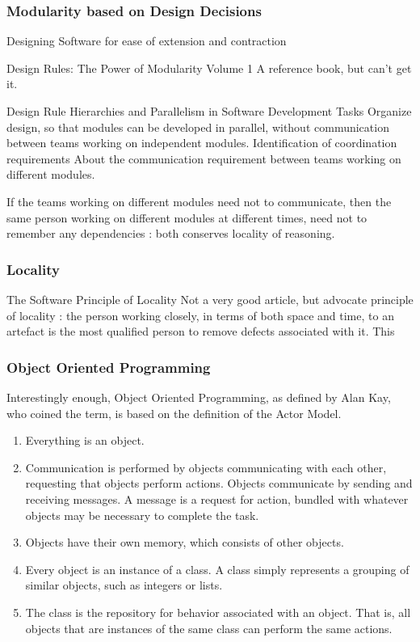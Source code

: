 \subsubsection{Modularity based on Design Decisions}

Designing Software for ease of extension and contraction \cite{Parnas1979}

Design Rules: The Power of Modularity Volume 1 \cite{Baldwin1999}
A reference book, but can't get it.

Design Rule Hierarchies and Parallelism in Software Development Tasks \cite{Wong2009}
Organize design, so that modules can be developed in parallel, without communication between teams working on independent modules.
Identification of coordination requirements \cite{Cataldo2006}
About the communication requirement between teams working on different modules.

If the teams working on different modules need not to communicate, then the same person working on different modules at different times, need not to remember any dependencies : both conserves locality of reasoning.


\subsubsection{Locality}

The Software Principle of Locality \cite{Dobson}
Not a very good article, but advocate principle of locality :
the person working closely, in terms of both space and time, to an artefact is the most qualified person to remove defects associated with it. This


\subsubsection{Object Oriented Programming}

Interestingly enough, Object Oriented Programming, as defined by Alan Kay, who coined the term, is based on the definition of the Actor Model.

\begin{enumerate}
\item Everything is an object.
\item Communication is performed by objects communicating with each other, requesting that objects perform actions. Objects communicate by sending and receiving messages. A message is a request for action, bundled with whatever objects may be necessary to complete the task.
\item Objects have their own memory, which consists of other objects.
\item Every object is an instance of a class. A class simply represents a grouping of similar objects, such as integers or lists.
\item The class is the repository for behavior associated with an object. That is, all objects that are instances of the same class can perform the same actions.
\end{enumerate}


